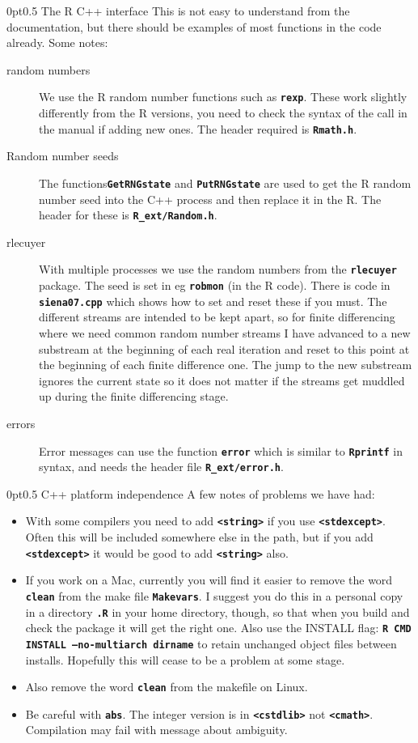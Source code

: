 \documentclass[12pt, a4paper]{article}
\makeatletter
\renewcommand{\=}{\,=\,}
\newcommand{\+}{\,+\,}
\newcommand{\sfn}[1]{\textbf{\texttt{#1}}}
\renewcommand{\section}{\@startsection{section}{1}
                {0pt}{\baselineskip}{0.5\baselineskip}
                {\centering\sffamily} }
\makeatother
\begin{document}
\section{The R C++ interface}
This is not easy to understand from the documentation, but there should be
examples of most functions in the code already. Some notes:
\begin{description}
\item[random numbers]
We use the R random number functions such as \sfn{rexp}. These work slightly
differently from the R versions, you need to check the syntax of the call in
the manual if adding new ones. The header required is \sfn{Rmath.h}. 
\item[Random number seeds] The functions\sfn{GetRNGstate} and 
\sfn{PutRNGstate}  are used to get the R random number seed into the C++
process and then replace it in the R. The header for these is 
\sfn{R\_ext/Random.h}.
\item[rlecuyer]
With multiple processes we use the random numbers from the \sfn{rlecuyer}
package. The seed is set in eg \sfn{robmon} (in the R code). There is code in
\sfn{siena07.cpp} which shows how to set and reset these if you must. The
different streams are intended to be kept apart, so for finite differencing
where we need common random number streams I have advanced to a new substream at
the beginning of each real iteration and reset to this point at the beginning of
each finite difference one. The jump to the new substream ignores the current
state so it does not matter if the streams get muddled up during the finite
differencing stage.
\item[errors]
Error messages can use the function \sfn{error} which is similar to
\sfn{Rprintf} in syntax, and needs the header file \sfn{R\_ext/error.h}.
\end{description}
\section{C++ platform independence}
A few notes of problems we have had:
\begin{itemize}
\item With some compilers you need to add \sfn{<string>} if you use
  \sfn{<stdexcept>}. Often this will be included somewhere else in the path, but
  if you add \sfn{<stdexcept>} it would be good to add \sfn{<string>} also.
  \item If you work on a Mac, currently you will find it easier to remove the
    word \sfn{clean} from the make file \sfn{Makevars}. I suggest you do this in
    a personal copy in a directory \sfn{.R} in your home directory, though, so
    that when you build and check the package it will get the right one. Also
    use the INSTALL flag: \sfn{R CMD INSTALL --no-multiarch dirname} to retain
    unchanged object files between installs. Hopefully this will cease to be a
    problem at some stage.
\item Also remove the word \sfn{clean} from the makefile on Linux.  
  \item Be careful with \sfn{abs}. The integer version is in \sfn{<cstdlib>} not
    \sfn{<cmath>}. Compilation may fail with message about ambiguity.
\end{itemize}
\end{document}
